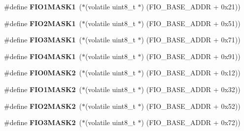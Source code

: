 \begin{DoxyCompactItemize}
\mbox{\label{group__lpc24xx__regs_ga23d8ecf9a2e3242c6361700dbde85590}} 
\#define {\bfseries F\+I\+O1\+M\+A\+S\+K1}~($\ast$(volatile uint8\+\_\+t $\ast$) (F\+I\+O\+\_\+\+B\+A\+S\+E\+\_\+\+A\+D\+DR + 0x21))
\item 
\mbox{\label{group__lpc24xx__regs_ga01d4487de6b22ebb191d67ee5b0b7e58}} 
\#define {\bfseries F\+I\+O2\+M\+A\+S\+K1}~($\ast$(volatile uint8\+\_\+t $\ast$) (F\+I\+O\+\_\+\+B\+A\+S\+E\+\_\+\+A\+D\+DR + 0x51))
\item 
\mbox{\label{group__lpc24xx__regs_gab139db94fa56f733dae4803b012d1e9c}} 
\#define {\bfseries F\+I\+O3\+M\+A\+S\+K1}~($\ast$(volatile uint8\+\_\+t $\ast$) (F\+I\+O\+\_\+\+B\+A\+S\+E\+\_\+\+A\+D\+DR + 0x71))
\item 
\mbox{\label{group__lpc24xx__regs_gaeaea4bf025e563b208ba6e22c2188d9a}} 
\#define {\bfseries F\+I\+O4\+M\+A\+S\+K1}~($\ast$(volatile uint8\+\_\+t $\ast$) (F\+I\+O\+\_\+\+B\+A\+S\+E\+\_\+\+A\+D\+DR + 0x91))
\item 
\mbox{\label{group__lpc24xx__regs_ga69c1024c4f3dcb64fe5f83d50f9b5497}} 
\#define {\bfseries F\+I\+O0\+M\+A\+S\+K2}~($\ast$(volatile uint8\+\_\+t $\ast$) (F\+I\+O\+\_\+\+B\+A\+S\+E\+\_\+\+A\+D\+DR + 0x12))
\item 
\mbox{\label{group__lpc24xx__regs_ga4bceb523c4218fd7f93935a858a4335e}} 
\#define {\bfseries F\+I\+O1\+M\+A\+S\+K2}~($\ast$(volatile uint8\+\_\+t $\ast$) (F\+I\+O\+\_\+\+B\+A\+S\+E\+\_\+\+A\+D\+DR + 0x32))
\item 
\mbox{\label{group__lpc24xx__regs_ga631fa02329d50bf9185b874558bad783}} 
\#define {\bfseries F\+I\+O2\+M\+A\+S\+K2}~($\ast$(volatile uint8\+\_\+t $\ast$) (F\+I\+O\+\_\+\+B\+A\+S\+E\+\_\+\+A\+D\+DR + 0x52))
\item 
\mbox{\label{group__lpc24xx__regs_ga11920cb2a2e2e4234f171dcd702339a5}} 
\#define {\bfseries F\+I\+O3\+M\+A\+S\+K2}~($\ast$(volatile uint8\+\_\+t $\ast$) (F\+I\+O\+\_\+\+B\+A\+S\+E\+\_\+\+A\+D\+DR + 0x72))
\item 
\mbox{\label{group__lpc24xx__regs_ga9f1f533a290a880070795d7da78e2c2b}} 

\end{DoxyCompactItemize}

